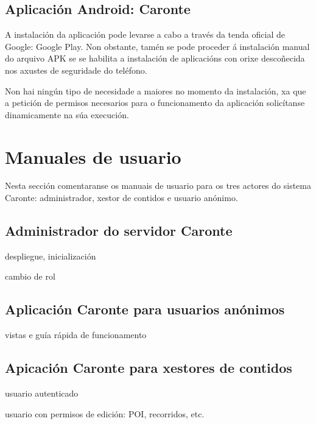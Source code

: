 \subsection{Aplicación Android: Caronte}
A instalación da aplicación pode levarse a cabo a través da tenda oficial de Google: Google Play. Non obstante, tamén se pode proceder á instalación manual do arquivo APK se se habilita a instalación de aplicacións con orixe descoñecida nos axustes de seguridade do teléfono.

Non hai ningún tipo de necesidade a maiores no momento da instalación, xa que a petición de permisos necesarios para o funcionamento da aplicación solicítanse dinamicamente na súa execución.


\section{Manuales de usuario}

Nesta sección comentaranse os manuais de usuario para os tres actores do sistema Caronte:
administrador, xestor de contidos e usuario anónimo.

\subsection{Administrador do servidor Caronte}
despliegue, inicialización

cambio de rol

\subsection{Aplicación Caronte para usuarios anónimos}

vistas e guía rápida de funcionamento

\subsection{Apicación Caronte para xestores de contidos}

usuario autenticado

usuario con permisos de edición: POI, recorridos, etc.

